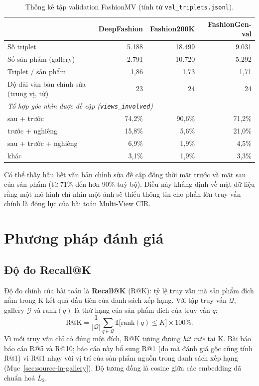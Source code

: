 \begin{table}[h]
\centering
\caption{Thống kê tập validation FashionMV (tính từ \texttt{val\_triplets.jsonl}).}
\label{tab:val-stats}
\begin{tabular}{lrrr}
\toprule
& DeepFashion & Fashion200K & FashionGen-val \\
\midrule
Số triplet & 5.188 & 18.499 & 9.031 \\
Số sản phẩm (gallery) & 2.791 & 10.720 & 5.292 \\
Triplet / sản phẩm & 1,86 & 1,73 & 1,71 \\
Độ dài văn bản chỉnh sửa (trung vị, từ) & 23 & 24 & 24 \\
\midrule
\multicolumn{4}{l}{\emph{Tổ hợp góc nhìn được đề cập (\texttt{views\_involved})}} \\
sau + trước & 74,2\% & 90,6\% & 71,2\% \\
trước + nghiêng & 15,8\% & 5,6\% & 21,0\% \\
sau + trước + nghiêng & 6,9\% & 1,9\% & 4,5\% \\
khác & 3,1\% & 1,9\% & 3,3\% \\
\bottomrule
\end{tabular}
\end{table}

Có thể thấy hầu hết văn bản chỉnh sửa đề cập đồng thời mặt trước và mặt sau của sản phẩm (từ 71\% đến hơn 90\% tuỳ bộ). Điều này khẳng định về mặt dữ liệu rằng một mô hình chỉ nhìn một ảnh sẽ thiếu thông tin cho phần lớn truy vấn -- chính là động lực của bài toán Multi-View CIR.

\section{Phương pháp đánh giá}\label{sec:evaluation}

\subsection{Độ đo Recall@K}

Độ đo chính của bài toán là \textbf{Recall@K} (R@K): tỷ lệ truy vấn mà sản phẩm đích nằm trong K kết quả đầu tiên của danh sách xếp hạng. Với tập truy vấn $\mathcal{Q}$, gallery $\mathcal{G}$ và $\mathrm{rank}(q)$ là thứ hạng của sản phẩm đích của truy vấn $q$:
\begin{equation}
    \mathrm{R@K} = \frac{1}{|\mathcal{Q}|} \sum_{q \in \mathcal{Q}} \mathbb{1}\big[\mathrm{rank}(q) \le K\big] \times 100\%.
    \label{eq:recall}
\end{equation}
Vì mỗi truy vấn chỉ có đúng một đích, R@K tương đương \emph{hit rate} tại K. Bài báo báo cáo R@5 và R@10; báo cáo này bổ sung R@1 (do mã đánh giá gốc cũng tính R@1) vì R@1 nhạy với vị trí của sản phẩm nguồn trong danh sách xếp hạng (Mục~\ref{sec:source-in-gallery}). Độ tương đồng là cosine giữa các embedding đã chuẩn hoá $L_2$.

